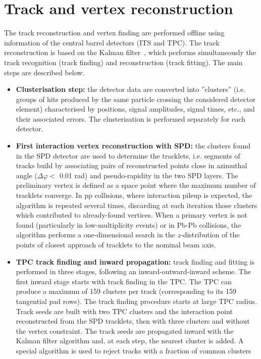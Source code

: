 \section{Track and vertex reconstruction}
\label{sec:tracking}
The track reconstruction and vertex finding are performed offline using information of the central
barrel detectors (ITS and TPC). The track reconstruction is based on the Kalman filter~\cite{Fruhwirth:1987fm}, which performs
simultaneously the track recognition (track finding) and reconstruction (track fitting). The main steps are described below.
\begin{itemize}
\item {\bf Clusterisation step:} the detector data are converted into ''clusters'' (i.e. groups of hits produced by the 
same particle crossing the considered detector element) characterised 
by positions, signal amplitudes, signal times, etc., and their associated errors. The clusterisation 
is performed separately for each detector. 
\item {\bf First interaction vertex reconstruction with SPD:} the clusters found in the SPD detector are used to determine the tracklets,
i.e. segments of tracks build by associating pairs of reconstructed points close in azimuthal angle ($\Delta \varphi <$ 0.01 rad) and 
pseudo-rapidity in the two SPD layers.
The preliminary vertex is defined as a space point where the maximum number of tracklets converge.
In pp collisions, where interaction pileup is expected, the algorithm is repeated several times, discarding at 
each iteration those clusters which contributed to already-found vertices. When a primary vertex is not found 
(particularly in low-multiplicity events) or in Pb-Pb collisions, the algorithm performs a one-dimensional 
search in the $z$-distribution of the points of closest approach of tracklets to the nominal beam axis.
\item {\bf TPC track finding and inward propagation:} track finding and fitting is performed in three stages, following an inward-outward-inward scheme.
The first inward stage starts with track finding in the TPC. The TPC can produce a maximum of 159 clusters per track
(corresponding to its 159 tangential pad rows). The track finding procedure starts at large TPC radius.
Track seeds are built with two TPC clusters and the interaction point reconstructed from the SPD tracklets, then with three clusters 
and without the vertex constraint. The track seeds are propagated inward with the Kalman filter algorithm and, at each step, 
the nearest cluster is added. A special algorithm is used to reject tracks with a fraction of common clusters

\end{itemize}

